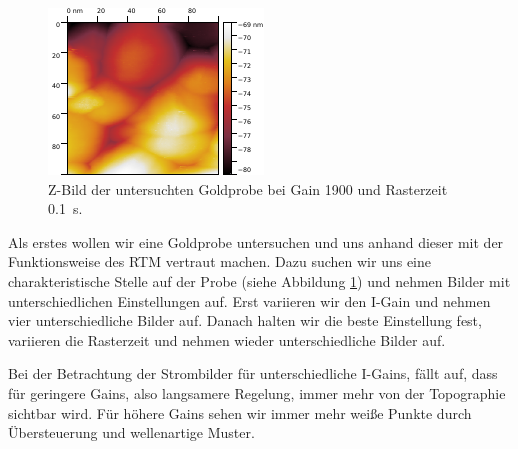 \begin{figure}[H]
\centering
\includegraphics[width=\textwidth]{../Gwyddion/Gold/GAIN_opt_Z_forward.pdf}
\caption{Z-Bild der untersuchten Goldprobe bei Gain 1900 und Rasterzeit \SI{0.1}{s}.}
\label{GAIN_opt_Z}
\end{figure}

Als erstes wollen wir eine Goldprobe untersuchen und uns anhand dieser mit der Funktionsweise des RTM vertraut machen. Dazu suchen wir uns eine charakteristische Stelle auf der Probe (siehe Abbildung \ref{GAIN_opt_Z}) und nehmen Bilder mit unterschiedlichen Einstellungen auf. Erst variieren wir den I-Gain und nehmen vier unterschiedliche Bilder auf. Danach halten wir die beste Einstellung fest, variieren die Rasterzeit und nehmen wieder unterschiedliche Bilder auf.

Bei der Betrachtung der Strombilder für unterschiedliche I-Gains, fällt auf, dass für geringere Gains, also langsamere Regelung, immer mehr von der Topographie sichtbar wird. Für höhere Gains sehen wir immer mehr weiße Punkte durch Übersteuerung und wellenartige Muster.

